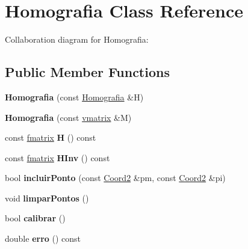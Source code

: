 \hypertarget{classHomografia}{}\section{Homografia Class Reference}
\label{classHomografia}


Collaboration diagram for Homografia\+:
\subsection*{Public Member Functions}
\begin{DoxyCompactItemize}
\item 
{\bfseries Homografia} (const \hyperlink{classHomografia}{Homografia} \&H)\hypertarget{classHomografia_a9ba4486db3b472d273d43f121eb574ce}{}\label{classHomografia_a9ba4486db3b472d273d43f121eb574ce}

\item 
{\bfseries Homografia} (const \hyperlink{classvmatrix}{vmatrix} \&M)\hypertarget{classHomografia_a1a80c35c86125f5106482b2b608c056b}{}\label{classHomografia_a1a80c35c86125f5106482b2b608c056b}

\item 
const \hyperlink{classfmatrix}{fmatrix} {\bfseries H} () const \hypertarget{classHomografia_a827d86c857184ecd933dc5df6049a131}{}\label{classHomografia_a827d86c857184ecd933dc5df6049a131}

\item 
const \hyperlink{classfmatrix}{fmatrix} {\bfseries H\+Inv} () const \hypertarget{classHomografia_a14442c779eedcede20566b7bec4bf712}{}\label{classHomografia_a14442c779eedcede20566b7bec4bf712}

\item 
bool {\bfseries incluir\+Ponto} (const \hyperlink{structCoord2}{Coord2} \&pm, const \hyperlink{structCoord2}{Coord2} \&pi)\hypertarget{classHomografia_af84cb5494aa005b0cd2ac73811d3baf8}{}\label{classHomografia_af84cb5494aa005b0cd2ac73811d3baf8}

\item 
void {\bfseries limpar\+Pontos} ()\hypertarget{classHomografia_a40cbe824866e9d8c5990153a7357d4da}{}\label{classHomografia_a40cbe824866e9d8c5990153a7357d4da}

\item 
bool {\bfseries calibrar} ()\hypertarget{classHomografia_a4bab6c630c296339a842e6c9c6adaf10}{}\label{classHomografia_a4bab6c630c296339a842e6c9c6adaf10}

\item 
double {\bfseries erro} () const \hypertarget{classHomografia_a79a23989d6bac9cc6ba6884518027398}{}\label{classHomografia_a79a23989d6bac9cc6ba6884518027398}


\end{DoxyCompactItemize}
